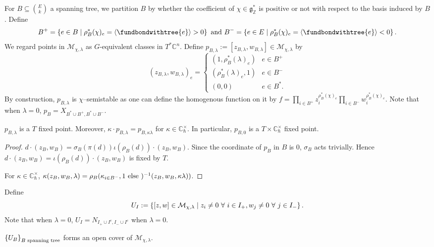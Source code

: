 \documentclass[b5paper]{article}
\newcommand{\MM}{\mathcal{M}}
\newcommand{\Chbar}{\mathbb{C}^\times _\hbar}
\begin{document}
For $B\subseteq \binom{E}{k}$ a spanning tree, we partition $B$ by whether the coefficient of $\chi\in \mathfrak{g}_\mathbb{Z}^*$ is positive or not with respect to the basis induced by $B$. Define 
\[
    B^+=\CB{e\in B\mid \rho^*_B(\chi)_e=\AB{\fundbondwithtree{e}}>0}
\textnormal{ and }
B^-=\CB{e\in E\mid \rho^*_B(\chi)_e=\AB{\fundbondwithtree{e}}<0}.
\]
We regard points in $\MM_{\chi,\lambda}$ as $G$-equivalent classes in $T^*\mathbb{C}^n$. 
Define $p_{B,\lambda}:=[z_{B,\lambda},w_{B,\lambda}]\in \MM_{\chi,\lambda}$ by 
\[
    (z_{B,\lambda},w_{B,\lambda})_e=\begin{cases}
    (1,\rho_B^*(\lambda)_e) & e\in B^+\\
    (\rho_B^*(\lambda)_e,1) & e\in B^-\\
    (0,0) & e\in B^*.
  \end{cases}
\]
By construction, $p_{B,\lambda}$ is $\chi$--semistable as one can define the homogenous function on it by $f=\prod_{i\in B^+}^{}z_i^{\rho_B^*(\chi)_e}\prod_{i\in B^-}^{}w_i^{\rho_B^*(\chi)_e}$.
Note that when $\lambda=0$, $p_B=X_{B^*\cup B^+,B^*\cup B^-}$.

\begin{proposition}[pps:]{}
  $p_{B,\lambda}$ is a $T$ fixed point.
  Moreover, $\kappa\cdot p_{B,\lambda}=p_{B,\kappa\lambda}$ for $\kappa\in \Chbar$. In particular, $p_{B,0}$ is a $T\times \Chbar$ fixed point.
  \begin{proof}
    $d\cdot (z_B,w_B)=\sigma_B(\pi(d))\iota(\rho_B(d))\cdot (z_B,w_B)$. Since the coordinate of $p_B$ in $B$ is $0$, $\sigma_B$ acts trivially. Hence $d\cdot (z_B,w_B)=\iota(\rho_B(d))\cdot (z_B,w_B)$ is fixed by $T$.

    For $\kappa\in \Chbar$, $\kappa(z_B,w_B,\lambda)=\rho_B(\kappa_{i\in B^-},1\textnormal{ else })^{-1}(z_B,w_B,\kappa\lambda))$.
  \end{proof}
\end{proposition}

Define 
\[
U_I:=\CB{[z,w]\in \MM_{\chi,\lambda}\mid z_i\neq 0\ \forall\ i\in I_+, w_j\neq 0\ \forall\ j\in I_-}.
\]
Note that when $\lambda=0$, $U_I=N_{I_+\cup I^c,I_-\cup I^c}$ when $\lambda=0$.

\begin{proposition}[pps:]{}
  $\left\{U_B\right\}_{B \textnormal{ spanning tree}}$ forms an open cover of $\MM_{\chi,\lambda}$.
\end{proposition}
\end{document}
